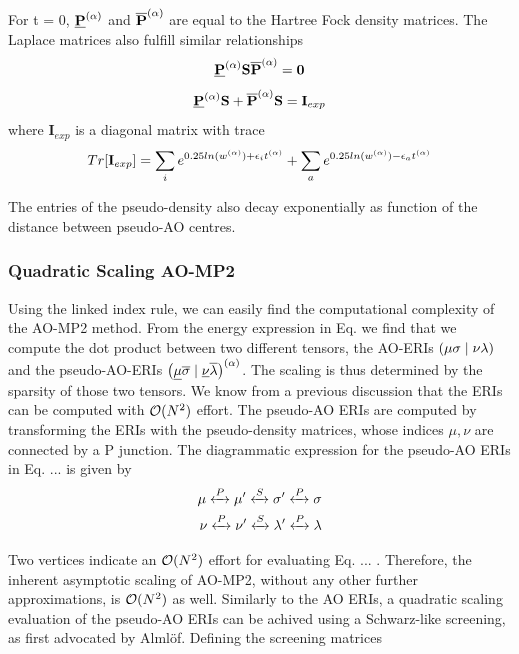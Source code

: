 \noindent For t = 0, $\underline{\mathbf{P}}^{(\alpha)}$ and $\overline{\mathbf{P}}^{(\alpha)}$ are equal to the Hartree Fock density matrices. The Laplace matrices also fulfill similar relationships
\begin{equation}
\underline{\mathbf{P}}^{(\alpha)} \mathbf{S} \overline{\mathbf{P}}^{(\alpha)} = \mathbf{0}
\end{equation}
\begin{equation}
\underline{\mathbf{P}}^{(\alpha)} \mathbf{S} + \overline{\mathbf{P}}^{(\alpha)} \mathbf{S} = \mathbf{I}_{exp}
\end{equation}
\noindent where $\mathbf{I}_{exp}$ is a diagonal matrix with trace
\begin{equation}
Tr[\mathbf{I}_{exp}] = \sum_i e^{0.25 ln(w^{(\alpha)}) + \epsilon_i t^{(\alpha)}} + \sum_a e^{0.25 ln(w^{(\alpha)}) - \epsilon_a t^{(\alpha)}}
\end{equation}

The entries of the pseudo-density also decay exponentially as function of the distance between pseudo-AO centres. 

\subsubsection{Quadratic Scaling AO-MP2}

Using the linked index rule, we can easily find the computational complexity of the AO-MP2 method. From the energy expression in Eq. we find that we compute the dot product between two different tensors, the AO-ERIs $\left( \mu\sigma \mid \nu\lambda \right)$ and the pseudo-AO-ERIs $\left( \underline{\mu}\overline{\sigma} \mid \underline{\nu}\overline{\lambda} \right)^{(\alpha)}$. The scaling is thus determined by the sparsity of those two tensors. We know from a previous discussion that the ERIs can be computed with $\mathcal{O}(N^{2})$ effort. The pseudo-AO ERIs are computed by transforming the ERIs with the pseudo-density matrices, whose indices $\mu,\nu$ are connected by a P junction. The diagrammatic expression for the pseudo-AO ERIs in Eq. ... is given by
\begin{equation}
\begin{split}
\mu \xleftrightarrow{P} \mu' \xleftrightarrow{S} \sigma' \xleftrightarrow{P} \sigma \\
\nu \xleftrightarrow{P} \nu' \xleftrightarrow{S} \lambda' \xleftrightarrow{P} \lambda
\end{split}
\end{equation}

\noindent Two vertices indicate an $\mathcal{O}(N^{2})$ effort for evaluating Eq. ... . Therefore, the inherent asymptotic scaling of AO-MP2, without any other further approximations, is $\mathcal{O}(N^{2})$ as well. Similarly to the AO ERIs, a quadratic scaling evaluation of the pseudo-AO ERIs can be achived using a Schwarz-like screening, as first advocated by Almlöf. Defining the screening matrices

